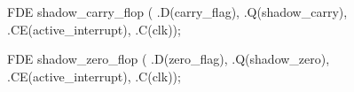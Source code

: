 \begin{vcode}
FDE shadow_carry_flop ( 
    .D(carry_flag),
    .Q(shadow_carry),
    .CE(active_interrupt),
    .C(clk));

FDE shadow_zero_flop ( 
    .D(zero_flag),
    .Q(shadow_zero),
    .CE(active_interrupt),
    .C(clk));
\end{vcode}


